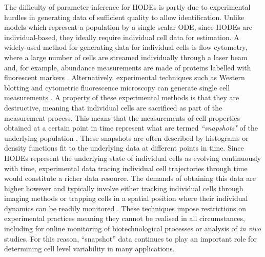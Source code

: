 The difficulty of parameter inference for HODEs is partly due to experimental hurdles in generating data of sufficient quality to allow identification. Unlike models which represent a population by a single scalar ODE, since HODEs are individual-based, they ideally require individual cell data for estimation. A widely-used method for generating data for individual cells is flow cytometry, where a large number of cells are streamed individually through a laser beam and, for example, abundance measurements are made of proteins labelled with fluorescent markers \cite{telford2012flow}. Alternatively, experimental techniques such as Western blotting and cytometric fluorescence microscopy can generate single cell measurements \cite{hughes2014single,hasenauer2011identification}. A property of these experimental methods is that they are destructive, meaning that individual cells are sacrificed as part of the measurement process. This means that the measurements of cell properties obtained at a certain point in time represent what are termed \emph{``snapshots"} of the underlying population \cite{hasenauer2011identification}. These snapshots are often described by histograms \cite{dixit2018maximum} or density functions \cite{waldherr2018estimation} fit to the underlying data at different points in time. Since HODEs represent the underlying state of individual cells as evolving continuously with time, experimental data tracing individual cell trajectories through time would constitute a richer data resource. The demands of obtaining this data are higher however and typically involve either tracking individual cells through imaging methods \cite{hilsenbeck2016software} or trapping cells in a spatial position where their individual dynamics can be readily monitored \cite{fritzsch2012single}. These techniques impose restrictions on experimental practices meaning they cannot be realised in all circumstances, including for online monitoring of biotechnological processes or analysis of \textit{in vivo} studies. For this reason, ``snapshot'' data continues to play an important role for determining cell level variability in many applications.

